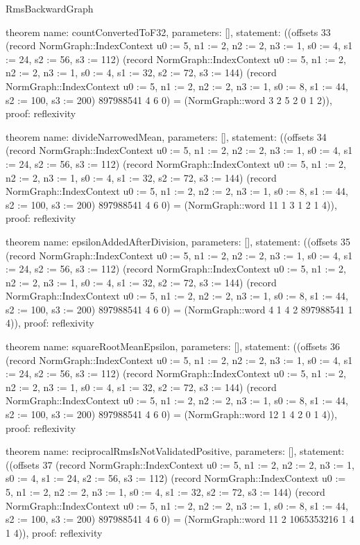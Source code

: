 \begin{lexlean}{RmsBackwardGraph}
\begin{semanticmodule}
theorem{
  name: countConvertedToF32,
  parameters: [],
  statement: ((offsets 33 (record NormGraph::IndexContext {u0 := 5, n1 := 2, n2 := 2, n3 := 1, s0 := 4, s1 := 24, s2 := 56, s3 := 112}) (record NormGraph::IndexContext {u0 := 5, n1 := 2, n2 := 2, n3 := 1, s0 := 4, s1 := 32, s2 := 72, s3 := 144}) (record NormGraph::IndexContext {u0 := 5, n1 := 2, n2 := 2, n3 := 1, s0 := 8, s1 := 44, s2 := 100, s3 := 200}) 897988541 4 6 0) = (NormGraph::word 3 2 5 2 0 1 2)),
  proof: reflexivity{}
}

theorem{
  name: divideNarrowedMean,
  parameters: [],
  statement: ((offsets 34 (record NormGraph::IndexContext {u0 := 5, n1 := 2, n2 := 2, n3 := 1, s0 := 4, s1 := 24, s2 := 56, s3 := 112}) (record NormGraph::IndexContext {u0 := 5, n1 := 2, n2 := 2, n3 := 1, s0 := 4, s1 := 32, s2 := 72, s3 := 144}) (record NormGraph::IndexContext {u0 := 5, n1 := 2, n2 := 2, n3 := 1, s0 := 8, s1 := 44, s2 := 100, s3 := 200}) 897988541 4 6 0) = (NormGraph::word 11 1 3 1 2 1 4)),
  proof: reflexivity{}
}

theorem{
  name: epsilonAddedAfterDivision,
  parameters: [],
  statement: ((offsets 35 (record NormGraph::IndexContext {u0 := 5, n1 := 2, n2 := 2, n3 := 1, s0 := 4, s1 := 24, s2 := 56, s3 := 112}) (record NormGraph::IndexContext {u0 := 5, n1 := 2, n2 := 2, n3 := 1, s0 := 4, s1 := 32, s2 := 72, s3 := 144}) (record NormGraph::IndexContext {u0 := 5, n1 := 2, n2 := 2, n3 := 1, s0 := 8, s1 := 44, s2 := 100, s3 := 200}) 897988541 4 6 0) = (NormGraph::word 4 1 4 2 897988541 1 4)),
  proof: reflexivity{}
}

theorem{
  name: squareRootMeanEpsilon,
  parameters: [],
  statement: ((offsets 36 (record NormGraph::IndexContext {u0 := 5, n1 := 2, n2 := 2, n3 := 1, s0 := 4, s1 := 24, s2 := 56, s3 := 112}) (record NormGraph::IndexContext {u0 := 5, n1 := 2, n2 := 2, n3 := 1, s0 := 4, s1 := 32, s2 := 72, s3 := 144}) (record NormGraph::IndexContext {u0 := 5, n1 := 2, n2 := 2, n3 := 1, s0 := 8, s1 := 44, s2 := 100, s3 := 200}) 897988541 4 6 0) = (NormGraph::word 12 1 4 2 0 1 4)),
  proof: reflexivity{}
}

theorem{
  name: reciprocalRmsIsNotValidatedPositive,
  parameters: [],
  statement: ((offsets 37 (record NormGraph::IndexContext {u0 := 5, n1 := 2, n2 := 2, n3 := 1, s0 := 4, s1 := 24, s2 := 56, s3 := 112}) (record NormGraph::IndexContext {u0 := 5, n1 := 2, n2 := 2, n3 := 1, s0 := 4, s1 := 32, s2 := 72, s3 := 144}) (record NormGraph::IndexContext {u0 := 5, n1 := 2, n2 := 2, n3 := 1, s0 := 8, s1 := 44, s2 := 100, s3 := 200}) 897988541 4 6 0) = (NormGraph::word 11 2 1065353216 1 4 1 4)),
  proof: reflexivity{}
}


\end{semanticmodule}
\end{lexlean}
